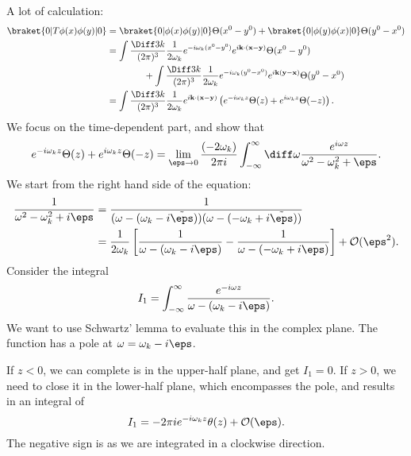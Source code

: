 \documentclass[12pt]{article}
\begin{document}
\begin{proofbox}
	A lot of calculation:
	\begin{align*}
		\braket{0|T\phi(x) \phi(y)|0} &= \braket{0|\phi(x) \phi(y)|0} \Theta(x^0 - y^0) + \braket{0|\phi(y)\phi(x)|0} \Theta(y^0 - x^0) \\
					      &= \int \frac{\Diff 3 k}{(2 \pi)^3} \frac{1}{2 \omega_k} e^{-i \omega_k (x^0 - y^0)} e^{i \mathbf{k} \cdot (\mathbf{x} - \mathbf{y})} \Theta(x^0 - y^0) \\
					      & \qquad \qquad + \int \frac{\Diff 3 k}{(2 \pi)^3} \frac{1}{2 \omega_k} e^{-i \omega_k (y^0 - x^0)} e^{i \mathbf{k}(\mathbf{y} - \mathbf{x})} \Theta(y^0 - x^0) \\
					      &= \int \frac{\Diff 3 k}{(2 \pi)^3} \frac{1}{2 \omega_k} e^{i \mathbf{k} \cdot (\mathbf{x} - \mathbf{y})} \left( e^{-i \omega_k z} \Theta(z) + e^{i\omega_k z} \Theta(-z) \right).
	\end{align*}
	We focus on the time-dependent part, and show that
	\[
		e^{-i\omega_k z}\Theta(z) + e^{i\omega_k z} \Theta(-z) = \lim_{\eps \to 0} \frac{(- 2 \omega_k)}{2 \pi i} \int_{-\infty}^{\infty} \diff \omega \frac{e^{ i \omega z}}{\omega^2 - \omega_k^2 + \eps}.
	\]
	We start from the right hand side of the equation:
	\begin{align*}
		\frac{1}{\omega^2 - \omega_k^2 + i \eps} &= \frac{1}{(\omega - (\omega_k - i \tilde \eps))(\omega - (-\omega_k + i \tilde \eps))} \\
							 &= \frac{1}{2 \omega_k} \left[ \frac{1}{\omega - (\omega_k - i \eps)} - \frac{1}{\omega - (-\omega_k + i \eps)} \right] + \mathcal{O}(\eps^2).
	\end{align*}
	Consider the integral
	\[
	I_1 = \int_{-\infty}^{\infty} \frac{e^{-i \omega z}}{\omega - (\omega_k - i \eps)}.
	\]
	We want to use Schwartz' lemma to evaluate this in the complex plane. The function has a pole at $\omega = \omega_k - i \eps$.

	If $z < 0$, we can complete is in the upper-half plane, and get $I_1 = 0$. If $z > 0$, we need to close it in the lower-half plane, which encompasses the pole, and results in an integral of
	\[
	I_1 = - 2 \pi i e^{-i \omega_k z} \theta(z) + \mathcal{O}(\eps).
	\]
	The negative sign is as we are integrated in a clockwise direction.


\end{proofbox}
\end{document}
